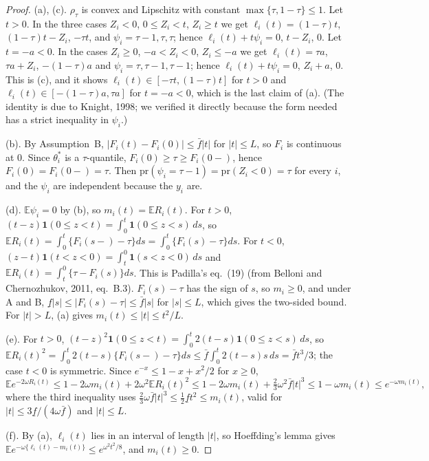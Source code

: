 \documentclass[11pt]{article}
\theoremstyle{definition}
\theoremstyle{remark}
\newcommand{\E}{\mathbb{E}}
\newcommand{\pr}{\mathrm{pr}}
\newcommand{\thetas}{\theta^{*}}
\newcommand{\om}{\omega}
\newcommand{\fl}{\underline f}
\newcommand{\fu}{\bar f}
\newcommand{\ind}{\mathbf 1}
\begin{document}
\begin{proof}
(a), (c). $\rho_\tau$ is convex and Lipschitz with constant $\max\{\tau,1-\tau\}\le1$. Let $t>0$. In the three cases $Z_i<0$, $0\le Z_i<t$, $Z_i\ge t$ we get $\ell_i(t)=(1-\tau)t$, $(1-\tau)t-Z_i$, $-\tau t$, and $\psi_i=\tau-1,\tau,\tau$; hence $\ell_i(t)+t\psi_i=0$, $t-Z_i$, $0$. Let $t=-a<0$. In the cases $Z_i\ge0$, $-a<Z_i<0$, $Z_i\le-a$ we get $\ell_i(t)=\tau a$, $\tau a+Z_i$, $-(1-\tau)a$ and $\psi_i=\tau,\tau-1,\tau-1$; hence $\ell_i(t)+t\psi_i=0$, $Z_i+a$, $0$. This is (c), and it shows $\ell_i(t)\in[-\tau t,(1-\tau)t]$ for $t>0$ and $\ell_i(t)\in[-(1-\tau)a,\tau a]$ for $t=-a<0$, which is the last claim of (a). (The identity is due to Knight, 1998; we verified it directly because the form needed has a strict inequality in $\psi_i$.)

(b). By Assumption~B, $|F_i(t)-F_i(0)|\le\fu|t|$ for $|t|\le L$, so $F_i$ is continuous at $0$. Since $\thetas_i$ is a $\tau$-quantile, $F_i(0)\ge\tau\ge F_i(0-)$, hence $F_i(0)=F_i(0-)=\tau$. Then $\pr(\psi_i=\tau-1)=\pr(Z_i<0)=\tau$ for every $i$, and the $\psi_i$ are independent because the $y_i$ are.

(d). $\E\psi_i=0$ by (b), so $m_i(t)=\E R_i(t)$. For $t>0$, $(t-z)\ind(0\le z<t)=\int_0^t\ind(0\le z<s)\,ds$, so $\E R_i(t)=\int_0^t\{F_i(s-)-\tau\}ds=\int_0^t\{F_i(s)-\tau\}ds$. For $t<0$, $(z-t)\ind(t<z<0)=\int_t^0\ind(s<z<0)\,ds$ and $\E R_i(t)=\int_t^0\{\tau-F_i(s)\}ds$. This is Padilla's eq.~(19) (from Belloni and Chernozhukov, 2011, eq.~B.3). $F_i(s)-\tau$ has the sign of $s$, so $m_i\ge0$, and under A and B, $\fl|s|\le|F_i(s)-\tau|\le\fu|s|$ for $|s|\le L$, which gives the two-sided bound. For $|t|>L$, (a) gives $m_i(t)\le|t|\le t^2/L$.

(e). For $t>0$, $(t-z)^2\ind(0\le z<t)=\int_0^t2(t-s)\ind(0\le z<s)\,ds$, so $\E R_i(t)^2=\int_0^t2(t-s)\{F_i(s-)-\tau\}ds\le\fu\int_0^t2(t-s)s\,ds=\fu t^3/3$; the case $t<0$ is symmetric. Since $e^{-x}\le1-x+x^2/2$ for $x\ge0$,
\[
\E e^{-2\om R_i(t)}\le1-2\om m_i(t)+2\om^2\E R_i(t)^2\le1-2\om m_i(t)+\tfrac23\om^2\fu|t|^3\le1-\om m_i(t)\le e^{-\om m_i(t)},
\]
where the third inequality uses $\tfrac23\om\fu|t|^3\le\tfrac12\fl t^2\le m_i(t)$, valid for $|t|\le3\fl/(4\om\fu)$ and $|t|\le L$.

(f). By (a), $\ell_i(t)$ lies in an interval of length $|t|$, so Hoeffding's lemma gives $\E e^{-\om\{\ell_i(t)-m_i(t)\}}\le e^{\om^2t^2/8}$, and $m_i(t)\ge0$.
\end{proof}

\end{document}

